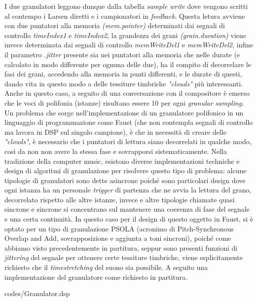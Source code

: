 I due granulatori leggono dunque dalla tabella \textit{sample write} dove vengono scritti
al contempo i Larsen diretti e i campionatori in \emph{feedback}. 
Questa letura avviene con due puntatori alla memoria \textit{(mem.pointer)} determinati 
dai segnali di controllo \textit{timeIndex1} e \textit{timeIndex2}, la grandezza dei grani 
\textit{(grain.duration)} viene invece determinata dai segnali di controllo 
\textit{memWriteDel1} e \textit{memWriteDel2}, infine il parametro \textit{.jitter}
presente sia nei puntatori alla memoria che nelle durate (e calcolato in modo differente per ognuna delle due),
ha il compito di decorrelare le fasi dei grani, accedendo alla memoria in punti differenti,
e le durate di questi, dando vita in questo modo a delle tessiture timbriche \textit{"clouds"} più interessanti.
Anche in questo caso, a seguito di una conversazione con il compositore è emerso che le voci di polifonia
(istanze) risultano essere 10 per ogni \textit{granular sampling}.
Un problema che sorge nell'implementazione di un granulatore polifonico in un linguaggio di 
programmazione come Faust (che non contempla segnali di controllo ma lavora in DSP sul singolo campione),
è che in necessità di creare delle \textit{"clouds"}, è necessario che i puntatori di lettura
siano decorrelati in qualche modo, così da non non avere la stessa fase e sovrapporsi sistematicamente.
Nella tradizione della computer music, esistono diverse implementazioni techniche e design 
di algoritmi di granulazione per risolvere questo tipo di problema:
alcune tipologie di granulatori sono dette asincrone poiché sono particolari design dove
ogni istanza ha un personale \textit{trigger} 
di partenza che ne avvia la lettura del grano, decorrelato rispetto alle altre istanze,
invece e altre tipologie chiamate quasi sincrone e sincrone si concentrano sul mantenere
una coerenza di fase del segnale e una certa continuità.
In questo caso per il design di questo oggetto in Faust, si è optato per un tipo di granulazione
PSOLA (acronimo di Pitch-Synchronous Overlap and Add, sovrapposizione e aggiunta a toni sincroni), 
poiché come abbiamo visto precedentemente in partitura, 
seppur sono presenti funzioni di \textit{jittering} del segnale
per ottenere certe tessiture timbriche, viene esplicitamente richiesto
che il \textit{timestretching} del suono sia possibile. 
A seguito una implementazione del granulatore come richiesto in partitura.

\vspace{0.5cm} 

{codes/Granulator.dsp}

